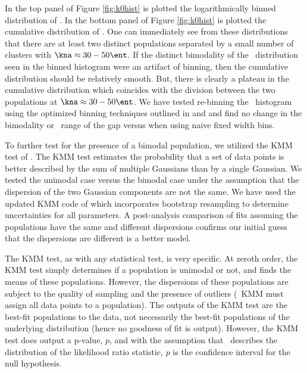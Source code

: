 \documentclass{emulateapj}
\begin{document}
In the top panel of Figure \ref{fig:k0hist} is plotted the
logarithmically binned distribution of \kna. In the bottom panel of
Figure \ref{fig:k0hist} is plotted the cumulative distribution of
\kna. One can immediately see from these distributions that there are
at least two distinct populations separated by a small number of
clusters with $\kna \approx 30-50 \ent$. If the distinct bimodality of
the \kna\ distribution seen in the binned histogram were an artifact
of binning, then the cumulative distribution should be relatively
smooth. But, there is clearly a plateau in the cumulative distribution
which coincides with the division between the two populations at $\kna
\approx 30-50 \ent$. We have tested re-binning the \kna\ histogram
using the optimized binning techniques outlined in \citet{knuthbin}
and \citet{2008arXiv0807.4820H} and find no change in the bimodality
or \kna\ range of the gap versus when using naive fixed width bins.

To further test for the presence of a bimodal population, we utilized
the KMM test of \citet{kmm1}. The KMM test estimates the probability
that a set of data points is better described by the sum of multiple
Gaussians than by a single Gaussian. We tested the unimodal case
versus the bimodal case under the assumption that the dispersion of
the two Gaussian components are not the same. We have used the updated
KMM code of \citet{kmm2} which incorporates bootstrap resampling to
determine uncertainties for all parameters. A post-analysis comparison
of fits assuming the populations have the same and different
dispersions confirms our initial guess that the dispersions are
different is a better model.

The KMM test, as with any statistical test, is very specific. At
zeroth order, the KMM test simply determines if a population is
unimodal or not, and finds the means of these populations. However,
the dispersions of these populations are subject to the quality of
sampling and the presence of outliers (\eg\ KMM must assign all data
points to a population). The outputs of the KMM test are the best-fit
populations to the data, not necessarily the best-fit populations of
the underlying distribution (hence no goodness of fit is
output). However, the KMM test does output a p-value, $p$, and with
the assumption that \chisq\ describes the distribution of the
likelihood ratio statistic, $p$ is the confidence interval for the
null hypothesis.
\end{document}
